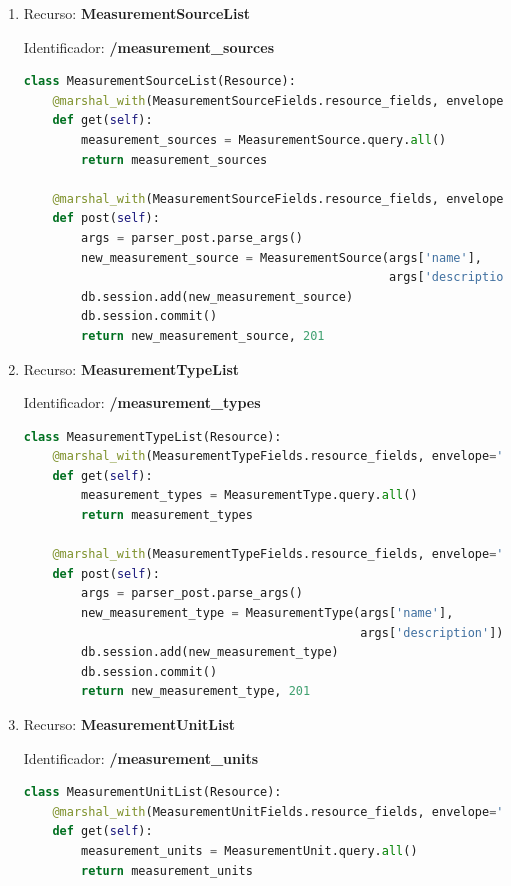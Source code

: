 \documentclass[a4paper,12pt]{article}
\begin{document}
\begin{enumerate}
\item 	Recurso: \textbf{MeasurementSourceList}

Identificador: \textbf{/measurement\_sources}

\begin{lstlisting}[language=Python]
class MeasurementSourceList(Resource):
    @marshal_with(MeasurementSourceFields.resource_fields, envelope='resource')
    def get(self):
        measurement_sources = MeasurementSource.query.all()
        return measurement_sources

    @marshal_with(MeasurementSourceFields.resource_fields, envelope='resource')
    def post(self):
        args = parser_post.parse_args()
        new_measurement_source = MeasurementSource(args['name'],
                                                   args['description'])
        db.session.add(new_measurement_source)
        db.session.commit()
        return new_measurement_source, 201
\end{lstlisting}

\item Recurso: \textbf{MeasurementTypeList}

Identificador: \textbf{/measurement\_types}

\begin{lstlisting}[language=Python]
class MeasurementTypeList(Resource):
    @marshal_with(MeasurementTypeFields.resource_fields, envelope='resource')
    def get(self):
        measurement_types = MeasurementType.query.all()
        return measurement_types

    @marshal_with(MeasurementTypeFields.resource_fields, envelope='resource')
    def post(self):
        args = parser_post.parse_args()
        new_measurement_type = MeasurementType(args['name'],
                                               args['description'])
        db.session.add(new_measurement_type)
        db.session.commit()
        return new_measurement_type, 201
\end{lstlisting}

\item Recurso: \textbf{MeasurementUnitList}

Identificador: \textbf{/measurement\_units}

\begin{lstlisting}[language=Python]
class MeasurementUnitList(Resource):
    @marshal_with(MeasurementUnitFields.resource_fields, envelope='resource')
    def get(self):
        measurement_units = MeasurementUnit.query.all()
        return measurement_units


\end{lstlisting}
\end{enumerate}
\end{document}
